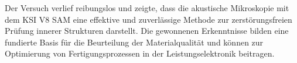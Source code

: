 
Der Versuch verlief reibungslos und zeigte, dass die akustische Mikroskopie mit dem KSI V8 SAM eine effektive und zuverlässige Methode zur zerstörungsfreien Prüfung innerer Strukturen darstellt. Die gewonnenen Erkenntnisse bilden eine fundierte Basis für die Beurteilung der Materialqualität und können zur Optimierung von Fertigungsprozessen in der Leistungselektronik beitragen.
